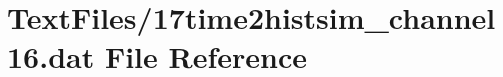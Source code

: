 \hypertarget{17time2histsim__channel16_8dat}{}\section{Text\+Files/17time2histsim\+\_\+channel16.dat File Reference}
\label{17time2histsim__channel16_8dat}
